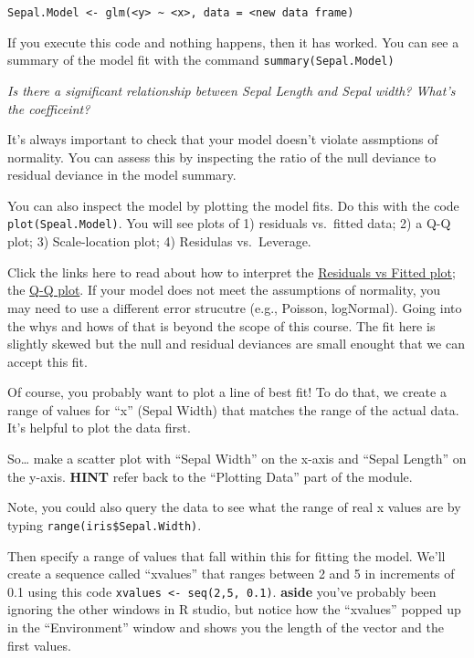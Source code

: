 \documentclass[]{book}
\begin{document}
\texttt{Sepal.Model\ \textless{}-\ glm(\textless{}y\textgreater{}\ \textasciitilde{}\ \textless{}x\textgreater{},\ data\ =\ \textless{}new\ data\ frame)}

If you execute this code and nothing happens, then it has worked. You can see a summary of the model fit with the command \texttt{summary(Sepal.Model)}

\emph{Is there a significant relationship between Sepal Length and Sepal width? What's the coefficeint?}

It's always important to check that your model doesn't violate assmptions of normality. You can assess this by inspecting the ratio of the null deviance to residual deviance in the model summary.

You can also inspect the model by plotting the model fits. Do this with the code \texttt{plot(Speal.Model)}. You will see plots of 1) residuals vs.~fitted data; 2) a Q-Q plot; 3) Scale-location plot; 4) Residulas vs.~Leverage.

Click the links here to read about how to interpret the \href{https://stats.stackexchange.com/questions/76226/interpreting-the-residuals-vs-fitted-values-plot-for-verifying-the-assumptions}{Residuals vs Fitted plot}; the \href{https://stats.stackexchange.com/questions/101274/how-to-interpret-a-qq-plot}{Q-Q plot}. If your model does not meet the assumptions of normality, you may need to use a different error strucutre (e.g., Poisson, logNormal). Going into the whys and hows of that is beyond the scope of this course. The fit here is slightly skewed but the null and residual deviances are small enought that we can accept this fit.

Of course, you probably want to plot a line of best fit! To do that, we create a range of values for ``x'' (Sepal Width) that matches the range of the actual data. It's helpful to plot the data first.

So\ldots{} make a scatter plot with ``Sepal Width'' on the x-axis and ``Sepal Length'' on the y-axis. \textbf{HINT} refer back to the ``Plotting Data'' part of the module.

Note, you could also query the data to see what the range of real x values are by typing \texttt{range(iris\$Sepal.Width)}.

Then specify a range of values that fall within this for fitting the model. We'll create a sequence called ``xvalues'' that ranges between 2 and 5 in increments of 0.1 using this code \texttt{xvalues\ \textless{}-\ seq(2,5,\ 0.1)}. \textbf{aside} you've probably been ignoring the other windows in R studio, but notice how the ``xvalues'' popped up in the ``Environment'' window and shows you the length of the vector and the first values.
\end{document}
